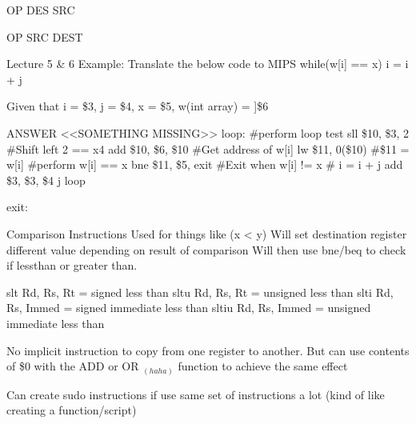\documentclass{article}
\newcommand\tab[1][0.5cm]{\hspace*{#1}}
\begin{document}
			OP DES SRC

			OP SRC DEST


Lecture 5 \& 6
	Example: Translate the below code to MIPS
		while(w[i] == x)
			i = i + j

		Given that i = \$3, j = \$4, x = \$5, w(int array) = ]\$6


		ANSWER
		<<SOMETHING MISSING>>
		loop: \#perform loop test
			sll \$10, \$3, 2 \tab \#Shift left 2 == x4
			add \$10, \$6, \$10 \tab \#Get address of w[i]
			lw \$11, 0(\$10) \tab \#\$11 = w[i]
			\#perform w[i] == x
			bne \$11, \$5, exit \tab \#Exit when w[i] != x
			\# i = i + j
			add \$3, \$3, \$4
			j loop

		exit:

	Comparison Instructions
		Used for things like (x < y)
		Will set destination register different value depending on result of comparison
		Will then use bne/beq to check if lessthan or greater than.

		slt Rd, Rs, Rt = signed less than
		sltu Rd, Rs, Rt = unsigned less than
		slti Rd, Rs, Immed  = signed immediate less than
		sltiu Rd, Rs, Immed  = unsigned immediate less than

		No implicit instruction to copy from one register to another. But can use contents of \$0 with the ADD or OR $_{(haha)}$ function to achieve the same effect

		Can create sudo instructions if use same set of instructions a lot (kind of like creating a function/script)
\end{document}
